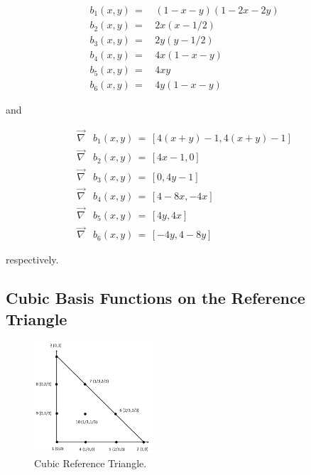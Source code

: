 \documentclass[11pt]{article}
\begin{document}
\begin{equation}
\label{eq::reftri_quad_basis_vals}
\begin{aligned}
b_1(x,y) \, =& \, (1-x-y) (1-2x-2y) \\
b_2(x,y) \, =& \, 2x(x-1/2) \\
b_3(x,y) \, =& \, 2y(y-1/2) \\
b_4(x,y) \, =& \, 4x (1-x-y) \\
b_5(x,y) \, =& \, 4xy\\
b_6(x,y) \, =& \, 4y (1-x-y)
\end{aligned}
\end{equation}

\noindent and

\begin{equation}
\label{eq::reftri_quad_basis_grads}
\begin{aligned}
\vec{\nabla}& b_1(x,y) \, = \, \left[ 4(x+y)-1 , 4(x+y)-1   \right] \\
\vec{\nabla}& b_2(x,y) \, = \, \left[ 4x-1, 0   \right] \\
\vec{\nabla}& b_3(x,y) \, = \, \left[ 0, 4y-1   \right] \\
\vec{\nabla}& b_4(x,y) \, = \, \left[ 4-8x, -4x   \right] \\
\vec{\nabla}& b_5(x,y) \, = \, \left[ 4y, 4x   \right] \\
\vec{\nabla}& b_6(x,y) \, = \, \left[ -4y, 4-8y   \right] 
\end{aligned}
\end{equation}

\noindent respectively.

\subsection{Cubic Basis Functions on the Reference Triangle}
\label{sec::triref_cubic}

\begin{figure}[hbt]
\centering
\includegraphics[width=0.4\textwidth]{./Figures/ref_triangle_cubic.png}
\caption{Cubic Reference Triangle.}
\hspace{0.5cm}
\label{fig::ref_triangle_cubic}
\end{figure}
\end{document}
